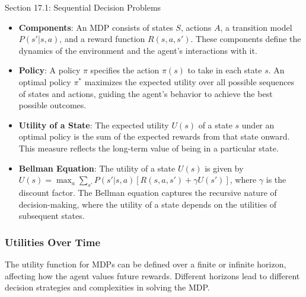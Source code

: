 \begin{notes}{Section 17.1: Sequential Decision Problems}
    \begin{highlight}
    
        \begin{itemize}
            \item \textbf{Components}: An MDP consists of states \(S\), actions \(A\), a transition model \(P(s' | s, a)\), and a reward function \(R(s, a, s')\). These components define the dynamics of 
            the environment and the agent's interactions with it.
            \item \textbf{Policy}: A policy \(\pi\) specifies the action \(\pi(s)\) to take in each state \(s\). An optimal policy \(\pi^*\) maximizes the expected utility over all possible sequences of 
            states and actions, guiding the agent's behavior to achieve the best possible outcomes.
            \item \textbf{Utility of a State}: The expected utility \(U(s)\) of a state \(s\) under an optimal policy is the sum of the expected rewards from that state onward. This measure reflects the 
            long-term value of being in a particular state.
            \item \textbf{Bellman Equation}: The utility of a state \(U(s)\) is given by \(U(s) = \max_a \sum_{s'} P(s' | s, a) [R(s, a, s') + \gamma U(s')]\), where \(\gamma\) is the discount factor. The 
            Bellman equation captures the recursive nature of decision-making, where the utility of a state depends on the utilities of subsequent states.
        \end{itemize}
    
    \end{highlight}
    
    \subsubsection*{Utilities Over Time}
    
    The utility function for MDPs can be defined over a finite or infinite horizon, affecting how the agent values future rewards. Different horizons lead to different decision strategies and complexities 
    in solving the MDP.
    
    \begin{highlight}
    

\end{highlight}
\end{notes}
